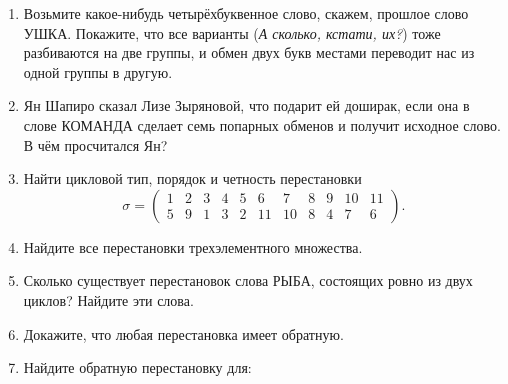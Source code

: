 \begin{enumerate}
    \item Возьмите какое-нибудь четырёхбуквенное слово, скажем, прошлое слово \textsf{УШКА}.
        Покажите, что все варианты (\emph{А сколько, кстати, их?}) тоже разбиваются на две группы,
        и обмен двух букв местами переводит нас из одной группы в другую.
    \item Ян Шапиро сказал Лизе Зыряновой, что подарит ей доширак,
        если она в слове \textsf{КОМАНДА} сделает семь попарных обменов и получит исходное слово.
        В чём просчитался Ян?
    \item Найти цикловой тип, порядок и четность перестановки
        \[
            \sigma = \begin{pmatrix}
                1 & 2 & 3 & 4 & 5 & 6 & 7 & 8 & 9 & 10 & 11 \\
                5 & 9 & 1 & 3 & 2 & 11 & 10 & 8 & 4 & 7 & 6
            \end{pmatrix}.
        \]
    \item Найдите все перестановки трехэлементного множества.
    \item Сколько существует перестановок слова \textsf{РЫБА}, состоящих ровно
        из двух циклов? Найдите эти слова.
    \item Докажите, что любая перестановка имеет обратную.
    \item Найдите обратную перестановку для: 


\end{enumerate}
